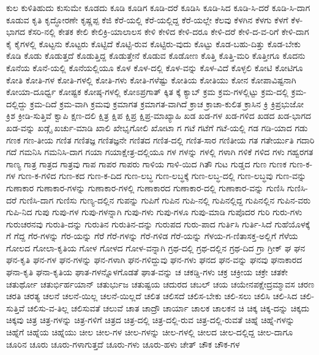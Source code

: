 {ಕುಲ
ಕುಳಿತಿಹುದು
ಕುಸುಮೇ
ಕೂಡದು
ಕೂಡಿ
ಕೂಡಿಗ
ಕೂಡಿ-ದರೆ
ಕೂಡಿಸಿ
ಕೂಡಿ-ಸಿದ
ಕೂಡಿ-ಸಿ-ದರೆ
ಕೂಡಿ-ಸಿ-ದಾಗ
ಕೂಡುವ
ಕೃತಿ
ಕೃದ್ಧೋರಣೇ
ಕೃಷ್ಣಪ್ಪ
ಕೆಜಿ
ಕೆರೆ-ಯಲ್ಲಿ
ಕೆರೆ-ಯಲ್ಲಿದ್ದ
ಕೆರೆ-ಯಲ್ಲೇ
ಕೆಲವು
ಕೆಳಗಿನ
ಕೆಳಗು
ಕೆಳಗೆ
ಕೆಳ-ಭಾಗದ
ಕೆಸರಿ-ನಲ್ಲಿ
ಕೇತಕ
ಕೇಲಿ
ಕೇಲಿಕ್ರಿ-ಯಾಲಾಲಸ
ಕೇಳಿ
ಕೇಳಿದ
ಕೇಳಿ-ದರೂ
ಕೇಳಿ-ದರೆ
ಕೇಳಿ-ದ-ವ-ರಿಗೆ
ಕೇಳಿ-ದಾಗ
ಕೈ
ಕೈಗಳಲ್ಲಿ
ಕೊಟ್ಟನು
ಕೊಟ್ಟರು
ಕೊಟ್ಟಿದೆ
ಕೊಟ್ಟಿ-ರುವ
ಕೊಟ್ಟಿರು-ವುದು
ಕೊಟ್ಟು
ಕೊಡ-ಬಹು-ದಿತ್ತು
ಕೊಡ-ಬೇಕು
ಕೊಡಿ
ಕೊಡು
ಕೊಡುತ್ತದೆ
ಕೊಡುತ್ತಿದ್ದ
ಕೊಡುತ್ತೇನೆ
ಕೊಡುವ
ಕೊಡೋಣ
ಕೊತ್ತಿ
ಕೊತ್ತಿ-ಮರಿ
ಕೊತ್ತೀಗೂ
ಕೊದನು
ಕೊನೆಯ
ಕೊನೆ-ಯಲ್ಲಿ
ಕೊನೆಯಲ್ಲಿಯೂ
ಕೊಳ
ಕೊಳ-ದಲ್ಲಿ
ಕೊಳ-ವನ್ನು
ಕೊಳ-ವಿದೆ
ಕೊಳ್ಳಲಿ
ಕೋಟಿ
ಕೋಟಿಗೂ
ಕೋತಿ
ಕೋತಿ-ಗಳ
ಕೋತಿ-ಗಳಲ್ಲಿ
ಕೋತಿ-ಗಳು
ಕೋತಿ-ಗಳೆಷ್ಟು
ಕೋತಿಯ
ಕೋತಿಯು
ಕೋನ
ಕೋಪಾವಿಷ್ಟನಾಗಿ
ಕೋಯಾ-ದೂರ್ಧ್ವ
ಕೋಷ್ಟಕ
ಕೋಷ್ಠ-ಗಳಲ್ಲಿ
ಕೋಽಪ್ರಗಾತ್
ಕ್ಕಿತ
ಕ್ಕೆ
ಕ್ಯಾಬ್
ಕ್ರಮ
ಕ್ರಮ-ಗಳಲ್ಲಿಟ್ಟು
ಕ್ರಮ-ದಲ್ಲಿ
ಕ್ರಮ-ದಲ್ಲಿದ್ದು
ಕ್ರಮ-ದಿದೆ
ಕ್ರಮ-ವಾಗಿ
ಕ್ರಮವು
ಕ್ರಮಾಗತ
ಕ್ರಮಾಗತ-ವಾಗಿದೆ
ಕ್ರಾಚ
ಕ್ರಾಚಾ-ಕುಲಿತ
ಕ್ರಾಸಿನ
ಕ್ರಿ
ಕ್ರಿಪ್ರಭುಜೋ
ಕ್ರಿಶ
ಕ್ರೀಡಿ-ಸುತ್ತಿವೆ
ಕ್ವಾಪಿ
ಕ್ಷಣ-ದಲಿ
ಕ್ಷಿತ್ರ
ಕ್ಷಿಪ
ಕ್ಷಿಪ್ರ
ಕ್ಷಿಪ್ರ-ಮಾಖ್ಯಾಹಿ
ಖಡ
ಖಡ-ಗಳ
ಖಡ-ಗಳಿದ
ಖಡದ
ಖಡ-ಭಾಗದ
ಖಡ-ವನ್ನು
ಖಡ್ಗೈ
ಖರ್ಚು-ಮಾಡಿ
ಖಾಲಿ
ಖೇಭೃಗೋಲಿ
ಖೋಟಾ
ಗ
ಗಟೆ
ಗಟೆಗೆ
ಗಟೆ-ಯಲ್ಲಿ
ಗಡ
ಗಡಿ-ಯಾದ
ಗಡು
ಗಣಕ
ಗಣ-ತೀಯ
ಗಣಿತ
ಗಣಿತಜ್ಞ
ಗಣಿತಜ್ಞನೇ
ಗಣಿತದ
ಗಣಿತ-ದಲ್ಲಿ
ಗಣಿತ-ಸಾರ
ಗಣಿತೀಯ
ಗತ
ಗತೇರ್ಯುತಿ
ಗದಾರಿ
ಗದೆ
ಗಮನಿಸಿ
ಗಮನಿಸಿ-ದಾಗ
ಗಯಾ
ಗಯಾಕ್ಷೇತ್ರ-ದಲ್ಲಿಯೂ
ಗಳ
ಗಳನ್ನು
ಗಳಲ್ಲಿ
ಗಳಾಗಿ
ಗಳಿಕೆ
ಗಳಿದ
ಗಳು
ಗಹ್ವರಗತ
ಗಾಣ್ಯ
ಗಾತ್ರ
ಗಾತ್ರದ
ಗಾತ್ರವು
ಗಾಪ
ಗಾಪರ
ಗಾಪರು
ಗಾಳಿಯ
ಗಾಳಿ-ಯಿದ
ಗಿತೌ
ಗುಟ
ಗುಡ್ಡದ
ಗುಣ
ಗುಣಕ
ಗುಣ-ಕ-ಗಳ
ಗುಣ-ಕ-ಗಳಿದ
ಗುಣ-ಕದ
ಗುಣ-ಕ-ದಿದ
ಗುಣ-ಲಬ್ಧ
ಗುಣ-ಲಬ್ಧಕ್ಕೆ
ಗುಣ-ಲಬ್ಧ-ದಲ್ಲಿ
ಗುಣ-ಲಬ್ಧವು
ಗುಣ-ವನ್ನು
ಗುಣಾಕಾರ
ಗುಣಾಕಾರ-ಗಳನ್ನು
ಗುಣಾಕಾರ-ಗಳಲ್ಲಿ
ಗುಣಾಕಾರದ
ಗುಣಾಕಾರ-ದಲ್ಲಿ
ಗುಣಾಕಾರ-ವನ್ನು
ಗುಣಿಸಿ
ಗುಣಿಸಿ-ದರೆ
ಗುಣಿಸಿ-ದಾಗ
ಗುಣಿಸು
ಗುಣ್ಯ-ದಲ್ಲಿನ
ಗುಪನ್ನು
ಗುಪಿಗೆ
ಗುಪಿನ
ಗುಪಿ-ನಲ್ಲಿ
ಗುಪಿನಲ್ಲಿದ್ದ
ಗುಪಿನಲ್ಲಿನ
ಗುಪಿನ-ವರು
ಗುಪಿ-ನಿದ
ಗುಪು
ಗುಪು-ಗಳ
ಗುಪು-ಗಳನ್ನಾಗಿ
ಗುಪು-ಗಳು
ಗುಪು-ಗಳೂ
ಗುಪು-ಮಾಡಿ
ಗುಪೊದರ
ಗುರಿ
ಗುರು-ಗಳು
ಗುರುಚರನವು
ಗುರುತಿ-ದನ್ನು
ಗುರುತಿನ
ಗುರುತಿನ-ದನ್ನು
ಗುರುಪದ
ಗುರು-ಪಾದ
ಗುರ್ತಿಸಿ
ಗುರ್ತಿ-ಸಿದೆ
ಗುಹೆಯೊಳಕ್ಕೆ
ಗೆ
ಗೆದ್ದ
ಗೆರ-ಗಳನ್ನು
ಗೆರ-ಯನ್ನು
ಗೆರೆ
ಗೆರೆ-ಗಳನ್ನು
ಗೆರೆ-ಗಳಿಡ
ಗೆರೆ-ಯನ್ನು
ಗೆಳಯ-ಗ-ಣಿತಾಸಕ್ತ-ಅಲ್ಲಿಗೆ
ಗೆಳೆಯ
ಗೋಲದ
ಗೋಲಾ-ಕೃತಿಯ
ಗೋಳ
ಗೋಳದ
ಗೋಳ-ವನ್ನಾಗಿ
ಗ್ರಥ-ದಲ್ಲಿ
ಗ್ರಥ-ದಲ್ಲಿನ
ಗ್ರಥ-ದಿದ
ಗ್ರಾ
ಗ್ರೀಕ್
ಘ
ಘನ
ಘನ-ಕೃತಿ
ಘನ-ಗಳ
ಘನ-ಗಳನ್ನು
ಘನ-ಗಳಾಗಿ
ಘನ-ಗಳಿದ್ದುವು
ಘನ-ಗಳು
ಘನದ
ಘನ-ವನ್ನು
ಘನವು
ಘನಾಕಾರದ
ಘನಾ-ಕೃತಿ
ಘನಾ-ಕೃತಿಯ
ಘಾತ-ಗಳನ್ನೊಳಗೊಡತೆ
ಘಾತ-ವನ್ನು
ಚ
ಚಕಡ್ಡಿ-ಗಳು
ಚಕ್ರ
ಚಕ್ರೀಯ
ಚಕ್ರೇ
ಚತಕೇ
ಚತುರ್ಥೋ
ಚತುರ್ಭಿರ್ಹಯಾನ್
ಚತುರ್ಭುಜ
ಚತುಷ್ಟಯ
ಚದುರದ
ಚಬಲ್
ಚಯ
ಚಯೇನಪಕ್ಷೇದ್ರಮ್ಮಾವಸ
ಚರಣ
ಚರತಿ
ಚರತ್ಯ
ಚಲನೆ
ಚಲನೆ-ಯಿಲ್ಲ
ಚಲನೆ-ಯಿಲ್ಲದೆ
ಚಲಿತ
ಚಲಿಸದೆ
ಚಲಿಸ-ಬೇಕು
ಚಲಿ-ಸಲು
ಚಲಿಸಿ
ಚಲಿ-ಸಿದ
ಚಲಿ-ಸುತ್ತಿವೆ
ಚಲಿಸು-ವ-ತಿಲ್ಲ
ಚಲಿಸುವತೆ
ಚಲುವೆ
ಚಾತ
ಚಾದ್ರೌ
ಚಾರ್ಯಾ
ಚಾಲಕ
ಚಾಲಕನ
ಚಿ
ಚಿಕ್ಕ
ಚಿಕ್ಕ-ದನ್ನು
ಚಿಕ್ಕದು
ಚಿಕ್ಕವು
ಚಿತ್ರ
ಚಿತ್ರ-ಗಳನ್ನು
ಚಿತ್ರ-ಗಳಿಗೆ
ಚಿತ್ರದ
ಚಿತ್ರ-ದಲ್ಲಿ
ಚಿತ್ರ-ದಲ್ಲಿ-ರುವ
ಚಿತ್ರ-ದಲ್ಲಿ-ರುವತೆ
ಚಿಹ್ನೆ
ಚಿಹ್ನೆ-ಗಳನ್ನು
ಚಿಹ್ನೆಗೆ
ಚಿಹ್ನೆಯ
ಚಿಹ್ನೆಯು
ಚೀಲ
ಚೀಲ-ಗಳ
ಚೀಲ-ಗಳನ್ನು
ಚೀಲ-ಗಳಲ್ಲಿ
ಚೀಲದ
ಚೀಲ-ದಲ್ಲಿದ್ದ
ಚೀಲ-ದಾಗೂ
ಚೂರಿನ
ಚೂರು
ಚೂರು-ಗಳಾಗುತ್ತದೆ
ಚೂರು-ಗಳು
ಚೂರು-ಹಳು
ಚೇತ್
ಚೌಕ
ಚೌಕ-ಗಳ
}
